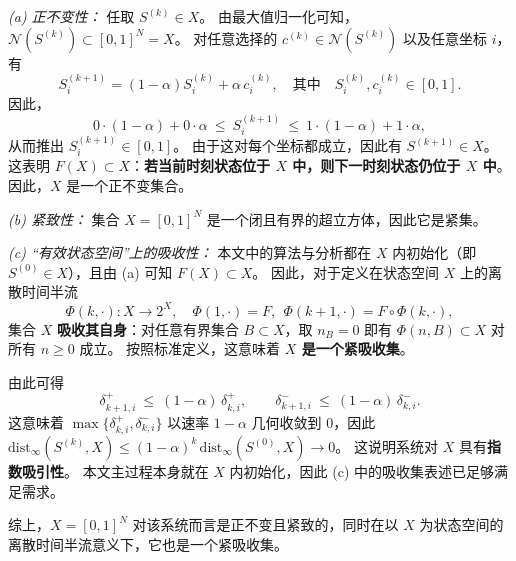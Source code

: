 \documentclass[journal]{IEEEtran}
\theoremstyle{plain}
\theoremstyle{definition}
\begin{document}
\begin{IEEEproof}
\textit{(a) 正不变性：}
任取 $S^{(k)}\in X$。
由最大值归一化可知，$\mathcal N(S^{(k)})\subset[0,1]^N=X$。
对任意选择的 $c^{(k)}\in\mathcal N(S^{(k)})$ 以及任意坐标 $i$，有
\begin{equation}
S^{(k+1)}_i=(1-\alpha)S^{(k)}_i+\alpha\,c^{(k)}_i,
\quad\text{其中}\quad S^{(k)}_i,c^{(k)}_i\in[0,1].
\end{equation}
因此，
\begin{equation}
0\cdot(1-\alpha)+0\cdot\alpha\ \le\ S^{(k+1)}_i\ \le\ 1\cdot(1-\alpha)+1\cdot\alpha,
\end{equation}
从而推出 $S^{(k+1)}_i\in[0,1]$。
由于这对每个坐标都成立，因此有 $S^{(k+1)}\in X$。
这表明 $F(X)\subset X$：\textbf{若当前时刻状态位于 $X$ 中，则下一时刻状态仍位于 $X$ 中}。
因此，$X$ 是一个正不变集合。

\textit{(b) 紧致性：}
集合 $X=[0,1]^N$ 是一个闭且有界的超立方体，因此它是紧集。

\textit{(c) “有效状态空间”上的吸收性：}
本文中的算法与分析都在 $X$ 内初始化（即 $S^{(0)}\in X$），且由 (a) 可知 $F(X)\subset X$。
因此，对于定义在状态空间 $X$ 上的离散时间半流
\begin{equation}
\Phi(k,\cdot):X\to 2^X,\quad \Phi(1,\cdot)=F,\ \ \Phi(k+1,\cdot)=F\circ\Phi(k,\cdot),
\end{equation}
集合 $X$ \textbf{吸收其自身}：对任意有界集合 $B\subset X$，取 $n_B=0$ 即有 $\Phi(n,B)\subset X$ 对所有 $n\ge 0$ 成立。
按照标准定义，这意味着 \textbf{$X$ 是一个紧吸收集}。

由此可得
\begin{equation}
\delta^+_{k+1,i}\ \le\ (1-\alpha)\,\delta^+_{k,i},\qquad 
\delta^-_{k+1,i}\ \le\ (1-\alpha)\,\delta^-_{k,i}.
\end{equation}
这意味着 $\max\{\delta^+_{k,i},\delta^-_{k,i}\}$ 以速率 $1-\alpha$ 几何收敛到 0，因此
$\mathrm{dist}_\infty(S^{(k)},X)\le (1-\alpha)^k\,\mathrm{dist}_\infty(S^{(0)},X)\to0$。
这说明系统对 $X$ 具有\textbf{指数吸引性}。
本文主过程本身就在 $X$ 内初始化，因此 (c) 中的吸收集表述已足够满足需求。

综上，$X=[0,1]^N$ 对该系统而言是正不变且紧致的，同时在以 $X$ 为状态空间的离散时间半流意义下，它也是一个紧吸收集。
\end{IEEEproof}
\end{document}

